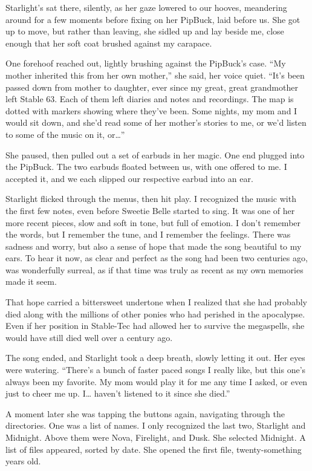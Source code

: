 Starlight’s sat there, silently, as her gaze lowered to our hooves, meandering around for a few moments before fixing on her PipBuck, laid before us. She got up to move, but rather than leaving, she sidled up and lay beside me, close enough that her soft coat brushed against my carapace.

One forehoof reached out, lightly brushing against the PipBuck’s case. “My mother inherited this from her own mother,” she said, her voice quiet. “It’s been passed down from mother to daughter, ever since my great, great grandmother left Stable 63. Each of them left diaries and notes and recordings. The map is dotted with markers showing where they’ve been. Some nights, my mom and I would sit down, and she’d read some of her mother’s stories to me, or we’d listen to some of the music on it, or…”

She paused, then pulled out a set of earbuds in her magic. One end plugged into the PipBuck. The two earbuds floated between us, with one offered to me. I accepted it, and we each slipped our respective earbud into an ear.

Starlight flicked through the menus, then hit play. I recognized the music with the first few notes, even before Sweetie Belle started to sing. It was one of her more recent pieces, slow and soft in tone, but full of emotion. I don’t remember the words, but I remember the tune, and I remember the feelings. There was sadness and worry, but also a sense of hope that made the song beautiful to my ears. To hear it now, as clear and perfect as the song had been two centuries ago, was wonderfully surreal, as if that time was truly as recent as my own memories made it seem.

That hope carried a bittersweet undertone when I realized that she had probably died along with the millions of other ponies who had perished in the apocalypse. Even if her position in Stable-Tec had allowed her to survive the megaspells, she would have still died well over a century ago.

The song ended, and Starlight took a deep breath, slowly letting it out. Her eyes were watering. “There’s a bunch of faster paced songs I really like, but this one’s always been my favorite. My mom would play it for me any time I asked, or even just to cheer me up. I… haven’t listened to it since she died.”

A moment later she was tapping the buttons again, navigating through the directories. One was a list of names. I only recognized the last two, Starlight and Midnight. Above them were Nova, Firelight, and Dusk. She selected Midnight. A list of files appeared, sorted by date. She opened the first file, twenty-something years old.

